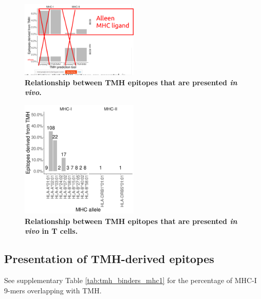 \begin{figure}[!htbp]
  \centering
  \includegraphics[width=0.5\textwidth]{bbbq_article_issue_157/figure_2c.png}
  \caption{
    \textbf{
      Relationship between TMH epitopes that are presented \emph{in vivo}.
    }
  }
  \label{fig:elution_mhc_ligands}
\end{figure}


\begin{figure}[!htbp]
  \centering
  \includegraphics[width=0.5\textwidth]{bbbq_article_issue_157/figure_2d.png}
  \caption{
    \textbf{
      Relationship between TMH epitopes that are presented \emph{in vivo}
      in T cells.
    }
  }
  \label{fig:elution_versus}
\end{figure}

\subsection{Presentation of TMH-derived epitopes}

See supplementary Table \ref{tab:tmh_binders_mhc1} 
for the percentage of MHC-I 9-mers overlapping with TMH.



